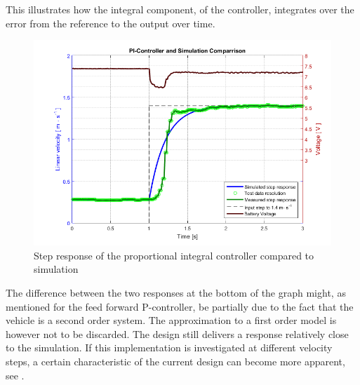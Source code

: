 This illustrates how the integral component, of the controller, integrates over the error from the reference to the output over time.
%
\begin{figure}[H]
 	\centering
 	\includegraphics[width=.9\textwidth]{figures/PIcontrollerStepRealVsSim}
 	\caption{Step response of the proportional integral controller compared to simulation}
 	\label{fig:PIcontrollerStepRealVsSim}
\end{figure}\vspace{-5mm}
The difference between the two responses at the bottom of the graph might, as mentioned for the feed forward P-controller, be partially due to the fact that the vehicle is a second order system. The approximation to a first order model is however not to be discarded. The design still delivers a response relatively close to the simulation.
If this implementation is investigated at different velocity steps, a certain characteristic of the current design can become more apparent, see .
%
